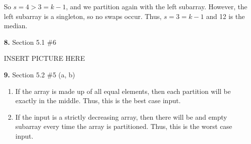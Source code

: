 \documentclass[letterpaper, 11pt]{article}
\newcommand{\hwnumbersec}[3]{\medskip \noindent\textbf{#1.} Section #2 \##3 \smallskip}
\begin{document}
So \(s = 4 > 3 = k - 1\), and we partition again with the left subarray.
However, the left subarray is a singleton, so no swaps occur. Thus, \(s = 3 = k
- 1\) and 12 is the median. 

\hwnumbersec{8}{5.1}{6}

INSERT PICTURE HERE

\hwnumbersec{9}{5.2}{5 (a, b)}

\begin{enumerate}[label = (\alph*)]
  \item If the array is made up of all equal elements, then each partition will be
  exactly in the middle. Thus, this is the best case input.
  \item If the input is a strictly decreasing array, then there will be and
    empty subarray every time the array is partitioned. Thus, this is the worst
    case input. 
\end{enumerate}
\end{document}
